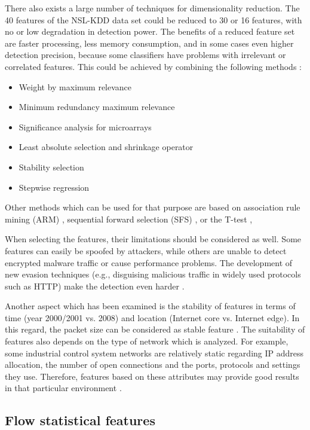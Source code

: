 \documentclass[conference]{IEEEtran}
\begin{document}
There also exists a large number of techniques for dimensionality reduction. The 40 features of the NSL-KDD data set could be reduced to 30 or 16 features, with no or low degradation in detection power. The benefits of a reduced feature set are faster processing, less memory consumption, and in some cases even higher detection precision, because some classifiers have problems with irrelevant or correlated features. This could be achieved by combining the following methods \cite{vasquez2015}:
\begin{itemize}
	\item Weight by maximum relevance
	\item Minimum redundancy maximum relevance
	\item Significance analysis for microarrays
	\item Least absolute selection and shrinkage operator
	\item Stability selection
	\item Stepwise regression
\end{itemize}

Other methods which can be used for that purpose are based on association rule mining (ARM) \cite{moustafa2015}, sequential forward selection (SFS) \cite{dehghani2010} \cite{xu2015}, or the T-test \cite{sopuru2019}, 

When selecting the features, their limitations should be considered as well. Some features can easily be spoofed by attackers, while others are unable to detect encrypted malware traffic or cause performance problems. The development of new evasion techniques (e.g., disguising malicious traffic in widely used protocols such as HTTP) make the detection even harder \cite{celik2015}.

Another aspect which has been examined is the stability of features in terms of time (year 2000/2001 vs. 2008) and location (Internet core vs. Internet edge). In this regard, the packet size can be considered as stable feature \cite{este2009}. The suitability of features also depends on the type of network which is analyzed. For example, some industrial control system networks are relatively static regarding IP address allocation, the number of open connections and the ports, protocols and settings they use. Therefore, features based on these attributes may provide good results in that particular environment \cite{mantere2013}.

\subsection{Flow statistical features}
\end{document}
